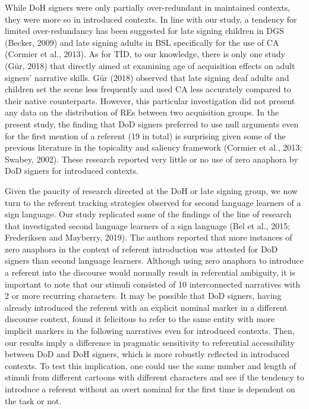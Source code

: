 \documentclass[]{elsarticle} %
\begin{document}
While DoH signers were only partially over-redundant in maintained
contexts, they were more so in introduced contexts. In line with our
study, a tendency for limited over-redundancy has been suggested for
late signing children in DGS (Becker, 2009) and late signing adults in
BSL specifically for the use of CA (Cormier et al., 2013). As for TİD,
to our knowledge, there is only one study (Gür, 2018) that directly
aimed at examining age of acquisition effects on adult signers'
narrative skills. Gür (2018) observed that late signing deaf adults and
children set the scene less frequently and used CA less accurately
compared to their native counterparts. However, this particular
investigation did not present any data on the distribution of REs
between two acquisition groups. In the present study, the finding that
DoD signers preferred to use null arguments even for the first mention
of a referent (19 in total) is surprising given some of the previous
literature in the topicality and saliency framework (Cormier et al.,
2013; Swabey, 2002). These research reported very little or no use of
zero anaphora by DoD signers for introduced contexts.

Given the paucity of research directed at the DoH or late signing group,
we now turn to the referent tracking strategies observed for second
language learners of a sign language. Our study replicated some of the
findings of the line of research that investigated second language
learners of a sign language (Bel et al., 2015; Frederiksen and Mayberry,
2019). The authors reported that more instances of zero anaphora in the
context of referent introduction was attested for DoD signers than
second language learners. Although using zero anaphora to introduce a
referent into the discourse would normally result in referential
ambiguity, it is important to note that our stimuli consisted of 10
interconnected narratives with 2 or more recurring characters. It may be
possible that DoD signers, having already introduced the referent with
an explicit nominal marker in a different discourse context, found it
felicitous to refer to the same entity with more implicit markers in the
following narratives even for introduced contexts. Then, our results
imply a difference in pragmatic sensitivity to referential accessibility
between DoD and DoH signers, which is more robustly reflected in
introduced contexts. To test this implication, one could use the same
number and length of stimuli from different cartoons with different
characters and see if the tendency to introduce a referent without an
overt nominal for the first time is dependent on the task or not.
\end{document}

